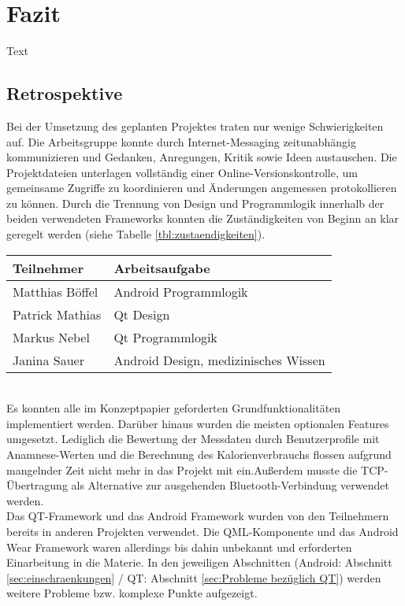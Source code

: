 \newpage
\section{Fazit}
Text
\subsection{Retrospektive} \label{sec:Retrospektive}
Bei der Umsetzung des geplanten Projektes traten nur wenige Schwierigkeiten auf. Die Arbeitsgruppe konnte durch Internet-Messaging zeitunabhängig kommunizieren und Gedanken, Anregungen, Kritik sowie Ideen austauschen. Die Projektdateien unterlagen vollständig einer Online-Versionskontrolle, um gemeinsame Zugriffe zu koordinieren und Änderungen angemessen protokollieren zu können. Durch die Trennung von Design und Programmlogik innerhalb der beiden verwendeten Frameworks konnten die Zuständigkeiten von Beginn an klar geregelt werden (siehe Tabelle \ref{tbl:zustaendigkeiten}).\\
\begin{table*}[h]
	\centering
		\begin{tabularx}{\textwidth}{l|X}
			\hline
			Teilnehmer & Arbeitsaufgabe \\
			\hline
			\hline
			Matthias Böffel & Android Programmlogik\\
			\hline
			Patrick Mathias & Qt Design\\
			\hline
			Markus Nebel & Qt Programmlogik\\
			\hline
			Janina Sauer & Android Design, medizinisches Wissen\\
			\hline
		\end{tabularx}
		\caption{Arbeitsaufgaben der Teilnehmer}
		\label{tbl:zustaendigkeiten}
\end{table*}
\\
Es konnten alle im Konzeptpapier geforderten Grundfunktionalitäten implementiert werden. Darüber hinaus wurden die meisten optionalen Features umgesetzt. Lediglich die Bewertung der Messdaten durch Benutzerprofile mit Anamnese-Werten und die Berechnung des Kalorienverbrauchs flossen aufgrund mangelnder Zeit nicht mehr in das Projekt mit ein.Außerdem musste die TCP-Übertragung als Alternative zur ausgehenden Bluetooth-Verbindung verwendet werden.
\\[0.5cm]
Das QT-Framework und das Android Framework wurden von den Teilnehmern bereits in anderen Projekten verwendet. Die QML-Komponente und das Android Wear Framework waren allerdings bis dahin unbekannt und erforderten Einarbeitung in die Materie. In den jeweiligen Abschnitten (Android: Abschnitt \ref{sec:einschraenkungen} / QT: Abschnitt \ref{sec:Probleme bezüglich QT}) werden weitere Probleme bzw. komplexe Punkte aufgezeigt.
